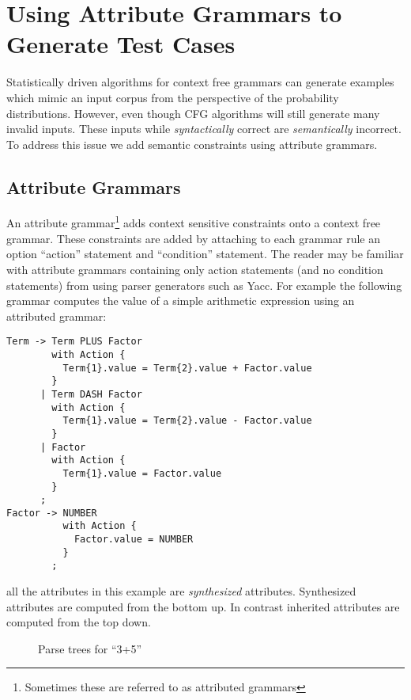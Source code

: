 
\section{Using Attribute Grammars to Generate Test Cases}
\label{attrgram}

Statistically driven algorithms for context free grammars can generate examples
which mimic an input corpus from the perspective of the probability
distributions. However, even though CFG algorithms will still generate many
invalid inputs. These inputs while \textit{syntactically} correct are
\textit{semantically} incorrect. To address this issue we add semantic
constraints using attribute grammars.

\subsection{Attribute Grammars}

An attribute grammar\footnote{Sometimes these are referred to as attributed
grammars} adds context sensitive constraints onto a context free grammar.
These constraints are added by attaching to each grammar rule an option
``action'' statement and ``condition'' statement. The reader may be familiar
with attribute grammars containing only action statements (and no condition
statements) from using parser generators such as Yacc. For example the following
grammar computes the value of a simple arithmetic expression using an attributed
grammar:

\begin{verbatim}
Term -> Term PLUS Factor
        with Action {
          Term{1}.value = Term{2}.value + Factor.value
        }
      | Term DASH Factor
        with Action {
          Term{1}.value = Term{2}.value - Factor.value
        }
      | Factor
        with Action {
          Term{1}.value = Factor.value
        }
      ;
Factor -> NUMBER 
          with Action {
            Factor.value = NUMBER
          }
        ;
\end{verbatim}

\noindent
all the attributes in this example are \textit{synthesized} attributes.
Synthesized attributes are computed from the bottom up. In contrast inherited
attributes are computed from the top down.\cite{Aho2007}

\begin{figure*}
  \begin{center}
  \end{center}
  \caption{Parse trees for ``3+5''}
  \label{asts}
\end{figure*}

